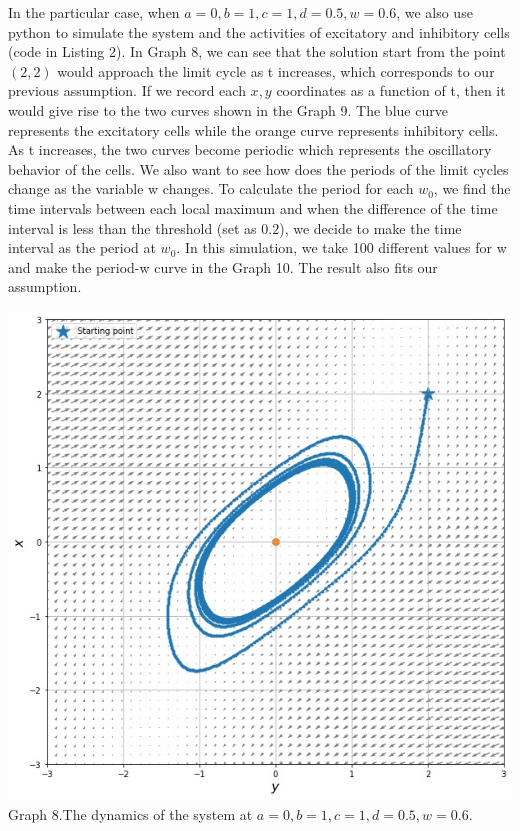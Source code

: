 \documentclass[12pt]{article}
\begin{document}
In the particular case, when $a = 0, b = 1, c = 1, d = 0.5, w=0.6$, we also use python to simulate the system and the activities of excitatory and inhibitory cells (code in Listing 2). In Graph 8, we can see that the solution start from the point $(2,2)$ would approach the limit cycle as t increases, which corresponds to our previous assumption. If we record each $x, y$ coordinates as a function of t, then it would give rise to the two curves shown in the Graph 9. The blue curve represents the excitatory cells while the orange curve represents inhibitory cells. As t increases, the two curves become periodic which represents the oscillatory behavior of the cells. 
We also want to see how does the periods of the limit cycles change as the variable w changes. To calculate the period for each $w_0$, we find the time intervals between each local maximum and when the difference of the time interval is less than the threshold (set as $0.2$), we decide to make the time interval as the period at $w_0$. In this simulation, we take 100 different values for w and make the period-w curve in the Graph 10. The result also fits our assumption.

\begin{center}
  \includegraphics[scale=0.3]{ Py-simu-01.jpg}\\
  \footnotesize{Graph 8.The dynamics of the system at $a=0,b=1,c=1,d=0.5,w=0.6$.}
  \end{center}
\end{document}
